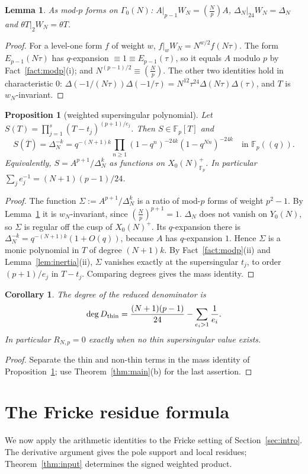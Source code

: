\documentclass[11pt,a4paper]{article}
\numberwithin{equation}{section}
\newtheorem{proposition}[theorem]{Proposition}
\newtheorem{lemma}[theorem]{Lemma}
\newtheorem{corollary}[theorem]{Corollary}
\theoremstyle{definition}
\theoremstyle{remark}
\newcommand{\Fp}{\mathbb F_p}
\newcommand{\Lp}[1]{\left(\frac{#1}{p}\right)}
\begin{document}
\begin{lemma}\label{lem:AW}
As mod-$p$ forms on $\Gamma_0(N)$: $A|_{p-1}W_N=\Lp{N}A$, $\Delta_N|_{24}W_N=\Delta_N$ and
$\theta T|_2W_N=\theta T$.
\end{lemma}
\begin{proof}
For a level-one form $f$ of weight $w$, $f|_wW_N=N^{w/2}f(N\tau)$. The form $E_{p-1}(N\tau)$ has
$q$-expansion $\equiv1\equiv E_{p-1}(\tau)$, so it equals $A$ modulo $p$ by Fact~\ref{fact:modp}(i);
and $N^{(p-1)/2}\equiv\Lp N$. The other two identities hold in characteristic $0$:
$\Delta(-1/(N\tau))\Delta(-1/\tau)=N^{12}\tau^{24}\Delta(N\tau)\Delta(\tau)$, and $T$ is
$w_N$-invariant.
\end{proof}

\begin{proposition}[weighted supersingular polynomial]\label{prop:S}
Let $S(T)=\prod_{j=1}^s(T-t_j)^{(p+1)/e_j}$. Then $S\in\Fp[T]$ and
\[
S(\overline T)=\Delta_N^{-k}=q^{-(N+1)k}\prod_{n\ge1}(1-q^n)^{-24k}(1-q^{Nn})^{-24k}\quad\text{in }\Fp((q)).
\]
Equivalently, $S=A^{p+1}/\Delta_N^{k}$ as functions on $X_0(N)^+_{\Fp}$. In particular
$\sum_j e_j^{-1}=(N+1)(p-1)/24$.
\end{proposition}
\begin{proof}
The function $\Sigma:=A^{p+1}/\Delta_N^k$ is a ratio of mod-$p$ forms of weight $p^2-1$. By Lemma~\ref{lem:AW} it is
$w_N$-invariant, since $\Lp N^{p+1}=1$. $\Delta_N$ does not vanish on $Y_0(N)$, so $\Sigma$ is regular off the cusp of
$X_0(N)^+$. Its $q$-expansion there is $\Delta_N^{-k}=q^{-(N+1)k}(1+O(q))$, because $A$ has
$q$-expansion $1$. Hence $\Sigma$ is a monic polynomial in $T$ of degree $(N+1)k$. By
Fact~\ref{fact:modp}(ii) and Lemma~\ref{lem:inertia}(ii), $\Sigma$ vanishes exactly at the supersingular
$t_j$, to order $(p+1)/e_j$ in $T-t_j$. Comparing degrees gives the mass identity.
\end{proof}

\begin{corollary}\label{cor:degree}
The degree of the reduced denominator is
\[
\deg D_{\rm thin}=\frac{(N+1)(p-1)}{24}-\sum_{e_i>1}\frac1{e_i}.
\]
In particular $R_{N,p}=0$ exactly when no thin supersingular value exists.
\end{corollary}
\begin{proof}
Separate the thin and non-thin terms in the mass identity of
Proposition~\ref{prop:S}; use Theorem~\ref{thm:main}(b) for the last assertion.
\end{proof}

\section{The Fricke residue formula}\label{sec:kz}
We now apply the arithmetic identities to the Fricke setting of
Section~\ref{sec:intro}. The derivative argument gives the pole support
and local residues; Theorem~\ref{thm:input} determines the signed
weighted product.
\end{document}
